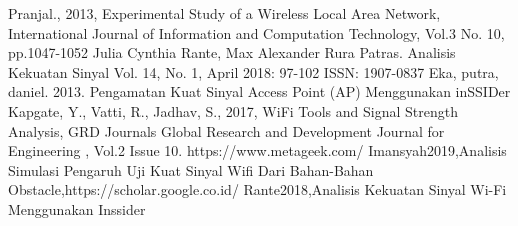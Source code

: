 \documentclass[conference]{IEEEtran}
\begin{document}
\begin{thebibliography}{00}
     Pranjal., 2013, Experimental Study of a Wireless Local Area Network, International Journal of Information and Computation Technology, Vol.3 No. 10, pp.1047-1052
     Julia Cynthia Rante, Max Alexander Rura Patras. Analisis Kekuatan Sinyal Vol. 14, No. 1, April 2018: 97-102 ISSN: 1907-0837
     Eka, putra, daniel. 2013. Pengamatan Kuat Sinyal Access Point (AP) Menggunakan inSSIDer
     Kapgate, Y., Vatti, R., Jadhav, S., 2017, WiFi Tools and Signal Strength Analysis, GRD Journals Global Research and Development Journal for Engineering , Vol.2 Issue 10.
     https://www.metageek.com/
     Imansyah2019,Analisis Simulasi Pengaruh Uji Kuat Sinyal Wifi Dari Bahan-Bahan Obstacle,https://scholar.google.co.id/
 Rante2018,Analisis Kekuatan Sinyal Wi-Fi Menggunakan Inssider
\end{thebibliography}
\end{document}
